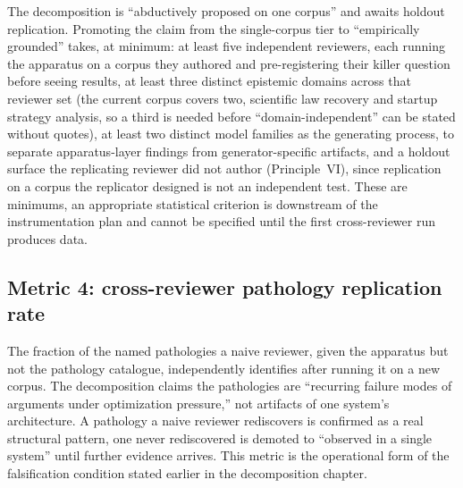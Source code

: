 \documentclass[
  11pt,
]{article}
\begin{document}
The decomposition is ``abductively proposed on one corpus'' and awaits
holdout replication. Promoting the claim from the single-corpus tier to
``empirically grounded'' takes, at minimum: at least five independent
reviewers, each running the apparatus on a corpus they authored and
pre-registering their killer question before seeing results, at least
three distinct epistemic domains across that reviewer set (the current
corpus covers two, scientific law recovery and startup strategy analysis,
so a third is needed before ``domain-independent'' can be stated without
quotes), at least two distinct model families as the generating process,
to separate apparatus-layer findings from generator-specific artifacts,
and a holdout surface the replicating reviewer did not author
(Principle~VI), since replication on a corpus the replicator designed is
not an independent test. These are minimums, an appropriate statistical
criterion is downstream of the instrumentation plan and cannot be
specified until the first cross-reviewer run produces data.

\subsection{Metric 4: cross-reviewer pathology replication
rate}\label{metric-4-cross-reviewer-pathology-replication-rate}

The fraction of the named pathologies a naive reviewer, given the
apparatus but not the pathology catalogue, independently identifies
after running it on a new corpus. The decomposition claims the
pathologies are ``recurring failure modes of arguments under optimization
pressure,'' not artifacts of one system's architecture. A pathology a
naive reviewer rediscovers is confirmed as a real structural pattern, one
never rediscovered is demoted to ``observed in a single system'' until
further evidence arrives. This metric is the operational form of the
falsification condition stated earlier in the decomposition chapter.
\end{document}
